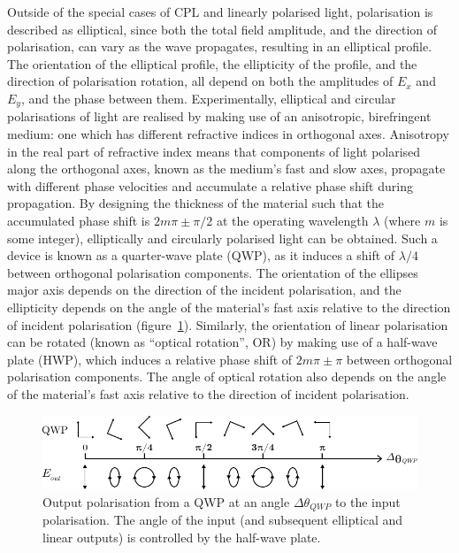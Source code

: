Outside of the special cases of CPL and linearly polarised light, polarisation is described as elliptical, since both the total field amplitude, and the direction of polarisation, can vary as the wave propagates, resulting in an elliptical profile. The orientation of the elliptical profile, the ellipticity of the profile, and the direction of polarisation rotation, all depend on both the amplitudes of $E_x$ and $E_y$, and the phase between them.
Experimentally, elliptical and circular polarisations of light are realised by making use of an anisotropic, birefringent medium: one which has different refractive indices in orthogonal axes. Anisotropy in the real part of refractive index means that components of light polarised along the orthogonal axes, known as the medium's fast and slow axes, propagate with different phase velocities and accumulate a relative phase shift during propagation. By designing the thickness of the material such that the accumulated phase shift is $2m\pi \pm \pi/2$ at the operating wavelength $\lambda$ (where $m$ is some integer), elliptically and circularly polarised light can be obtained. Such a device is known as a quarter-wave plate (QWP), as it induces a shift of $\lambda/4$ between orthogonal polarisation components. The orientation of the ellipses major axis depends on the direction of the incident polarisation, and the ellipticity depends on the angle of the material's fast axis relative to the direction of incident polarisation (figure~\ref{fig:background:Chirality:QWP}). Similarly, the orientation of linear polarisation can be rotated (known as ``optical rotation'', OR) by making use of a half-wave plate (HWP), which induces a relative phase shift of $2m\pi \pm \pi$ between orthogonal polarisation components. The angle of optical rotation also depends on the angle of the material's fast axis relative to the direction of incident polarisation.
\begin{figure}[htb!]
    \centering
    \includegraphics[scale=1.0]{./figures/background/chiroptics/QWP_in_out.pdf}
    \caption{\label{fig:background:Chirality:QWP}Output polarisation from a QWP at an angle $\Delta\theta_{QWP}$ to the input polarisation. The angle of the input (and subsequent elliptical and linear outputs) is controlled by the half-wave plate.}
\end{figure}

